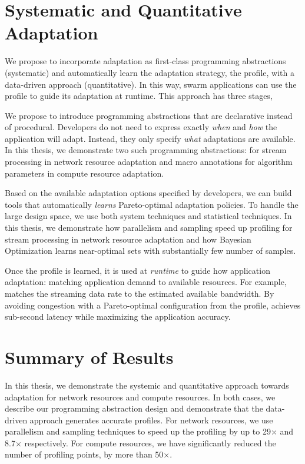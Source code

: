 \documentclass[thesis.tex]{subfiles}
\begin{document}
\section{Systematic and Quantitative Adaptation}
\label{sec:adaptation}

We propose to incorporate adaptation as first-class programming abstractions
(systematic) and automatically learn the adaptation strategy, the profile, with
a data-driven approach (quantitative). In this way, swarm applications can use
the profile to guide its adaptation at runtime. This approach has three stages,

 We propose to introduce programming
abstractions that are declarative instead of procedural. Developers do not need
to express exactly \emph{when} and \emph{how} the application will
adapt. Instead, they only specify \emph{what} adaptations are available. In this
thesis, we demonstrate two such programming abstractions: \maybe{} for stream
processing in network resource adaptation and macro annotations for algorithm
parameters in compute resource adaptation.

 Based on the available adaptation
options specified by developers, we can build tools that automatically
\emph{learns} Pareto-optimal adaptation policies. To handle the large design
space, we use both system techniques and statistical techniques. In this thesis,
we demonstrate how parallelism and sampling speed up profiling for stream
processing in network resource adaptation and how Bayesian Optimization learns
near-optimal sets with substantially few number of samples.

 Once the profile is learned, it is used at
\emph{runtime} to guide how application adaptation: matching application demand
to available resources. For example, \awstream{} matches the streaming data rate
to the estimated available bandwidth. By avoiding congestion with a
Pareto-optimal configuration from the profile, \awstream{} achieves sub-second
latency while maximizing the application accuracy.

\section{Summary of Results}
\label{sec:summary-results-1}

In this thesis, we demonstrate the systemic and quantitative approach towards
adaptation for network resources and compute resources. In both cases, we
describe our programming abstraction design and demonstrate that the data-driven
approach generates accurate profiles. For network resources, we use parallelism
and sampling techniques to speed up the profiling by up to 29$\times$ and
8.7$\times$ respectively. For compute resources, we have significantly reduced
the number of profiling points, by more than 50$\times$.
\end{document}
